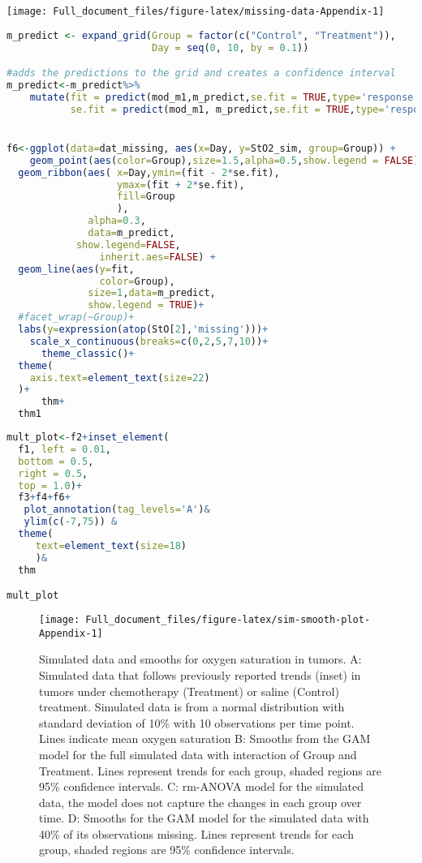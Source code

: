 \documentclass[
]{article}
\begin{document}
\texttt{[image: Full\_document\_files/figure-latex/missing-data-Appendix-1]}

\begin{lstlisting}[language=R]
m_predict <- expand_grid(Group = factor(c("Control", "Treatment")),
                         Day = seq(0, 10, by = 0.1))

#adds the predictions to the grid and creates a confidence interval
m_predict<-m_predict%>%
    mutate(fit = predict(mod_m1,m_predict,se.fit = TRUE,type='response')$fit,
           se.fit = predict(mod_m1, m_predict,se.fit = TRUE,type='response')$se.fit)


f6<-ggplot(data=dat_missing, aes(x=Day, y=StO2_sim, group=Group)) +
    geom_point(aes(color=Group),size=1.5,alpha=0.5,show.legend = FALSE)+
  geom_ribbon(aes( x=Day,ymin=(fit - 2*se.fit), 
                   ymax=(fit + 2*se.fit),
                   fill=Group
                   ),
              alpha=0.3,
              data=m_predict,
            show.legend=FALSE,
                inherit.aes=FALSE) +
  geom_line(aes(y=fit,
                color=Group),
              size=1,data=m_predict,
              show.legend = TRUE)+
  #facet_wrap(~Group)+
  labs(y=expression(atop(StO[2],'missing')))+
    scale_x_continuous(breaks=c(0,2,5,7,10))+
      theme_classic()+
  theme(
    axis.text=element_text(size=22)
  )+
      thm+
  thm1
\end{lstlisting}



\begin{lstlisting}[language=R]
mult_plot<-f2+inset_element(
  f1, left = 0.01, 
  bottom = 0.5, 
  right = 0.5, 
  top = 1.0)+
  f3+f4+f6+
   plot_annotation(tag_levels='A')&
   ylim(c(-7,75)) &
  theme(
     text=element_text(size=18)
     )&
  thm

mult_plot
\end{lstlisting}

\begin{figure}[H]

{\centering \texttt{[image: Full\_document\_files/figure-latex/sim-smooth-plot-Appendix-1]} 

}

\caption{Simulated data and smooths for oxygen saturation in tumors. A: Simulated data that follows previously reported trends (inset) in tumors under chemotherapy (Treatment) or saline (Control) treatment. Simulated data is from a normal distribution with standard deviation of 10\% with 10 observations per time point. Lines indicate mean oxygen saturation B: Smooths from the GAM model for the full simulated data with interaction of Group and Treatment. Lines represent trends for each group, shaded regions are 95\% confidence intervals. C: rm-ANOVA model for the simulated data, the model does not capture the changes in each group over time. D: Smooths for the GAM model for the simulated data with 40\% of its observations missing. Lines represent trends for each group, shaded regions are 95\% confidence intervals.}\label{fig:sim-smooth-plot-Appendix}
\end{figure}
\end{document}
